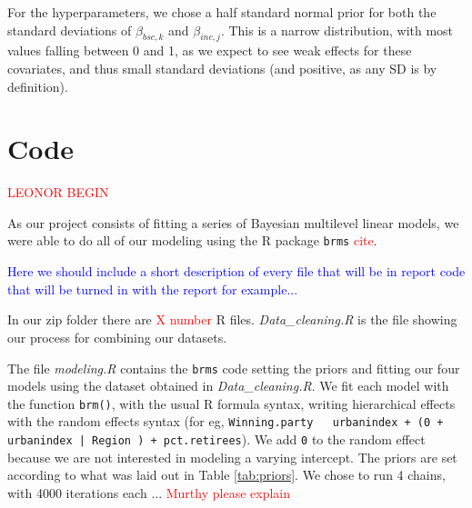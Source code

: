 \documentclass[12pt]{article}
\newcommand{\red}[1]{\textcolor{red}{#1}}
\newcommand{\blue}[1]{\textcolor{blue}{#1}}
\begin{document}
For the hyperparameters, we chose a half standard normal prior for both the standard deviations of $\beta_{bsc,k}$ and $\beta_{inc,j}$. This is a narrow distribution, with most values falling between 0 and 1, as we expect to see weak effects for these covariates, and thus small standard deviations (and positive, as any SD is by definition).









\section{Code}










\red{LEONOR BEGIN}

As our project consists of fitting a series of Bayesian multilevel linear models, we were able to do all of our modeling using the R package \verb|brms| \red{cite}.

\blue{Here we should include a short description of every file that will be in report code that will be turned in with the report for example...}

In our zip folder there are \red{X number} R files.
\textit{Data\_cleaning.R} is the file showing our process for combining our datasets.

The file \textit{modeling.R} contains the \verb|brms| code setting the priors and fitting our four models using the dataset obtained in \textit{Data\_cleaning.R}.
We fit each model with the function \verb|brm()|, with the usual R formula syntax, writing hierarchical effects with the random effects syntax (for eg, \texttt{Winning.party ~ urbanindex + (0 + urbanindex | Region ) + pct.retirees}). We add \verb|0| to the random effect because we are not interested in modeling a varying intercept.
The priors are set according to what was laid out in Table \ref{tab:priors}.
We chose to run 4 chains, with 4000 iterations each ... \red{Murthy please explain}
\end{document}
